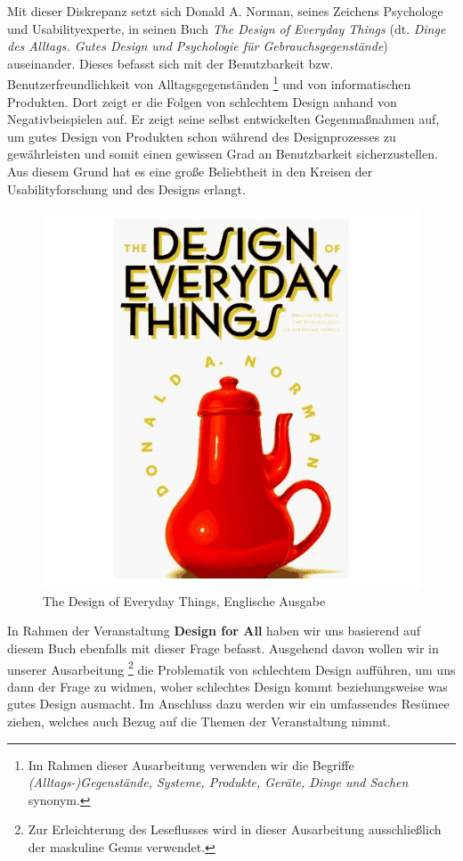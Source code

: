 \documentclass[parskip,headsepline, headtopline, %
footsepline, oneside, 12pt, headings=small]{scrreprt}
\newcommand{\setChapterQuote}[3]{\setchapterpreamble[o]{%
\dictum[#2 \emph{#3}]{\justifying {#1}}}}
\begin{document}
Mit dieser Diskrepanz setzt sich Donald A. Norman, seines Zeichens Psychologe und Usabilityexperte, in seinen Buch \textit{The Design of Everyday Things}\cite{don} (dt. \textit{Dinge des Alltags. Gutes Design und Psychologie für Gebrauchsgegenstände}) auseinander. Dieses befasst sich mit der  Benutzbarkeit bzw. Benutzerfreundlichkeit von Alltagsgegenständen \footnote{Im Rahmen dieser Ausarbeitung verwenden wir die Begriffe \textit{(Alltags-)Gegenstände, Systeme, Produkte, Geräte, Dinge und Sachen} synonym.} und von informatischen Produkten. Dort zeigt er die Folgen von schlechtem Design anhand von Negativbeispielen auf. 
Er zeigt seine selbst entwickelten Gegenmaßnahmen auf, um gutes Design von Produkten schon während des Designprozesses zu gewährleisten und somit einen gewissen Grad an Benutzbarkeit sicherzustellen.
Aus diesem Grund hat es eine große Beliebtheit in den Kreisen der Usabilityforschung und des Designs erlangt.

\begin{figure}[h]
\center
\includegraphics[width=.5\textwidth]{images/design}
\caption{The Design of Everyday Things, Englische Ausgabe}
\label{fig:buch}
\end{figure}

In Rahmen der Veranstaltung \textbf{Design for All} haben wir uns basierend auf diesem Buch ebenfalls mit dieser Frage befasst.
Ausgehend davon wollen wir in unserer Ausarbeitung \footnote{Zur Erleichterung des Leseflusses wird in dieser Ausarbeitung ausschließlich der maskuline Genus verwendet.} die Problematik von schlechtem Design aufführen, um uns dann der Frage zu widmen, woher schlechtes Design kommt beziehungsweise was gutes Design ausmacht. Im Anschluss dazu werden wir ein umfassendes Resümee ziehen, welches auch Bezug auf die Themen der Veranstaltung nimmt.

\end{document}
